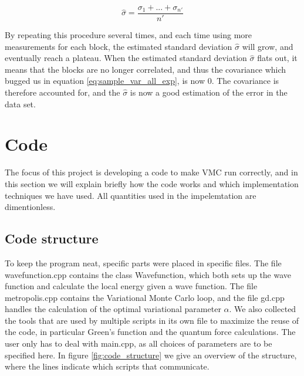 \documentclass[norsk,a4paper,12pt]{article}
\begin{document}
 \begin{equation}
 \hat{\sigma} = \frac{\sigma_1 + ... + \sigma_{n'}}{n'}
 \end{equation}
 
By repeating this procedure several times, and each time using more measurements for each block, the estimated standard deviation $\hat{\sigma}$ will grow, and eventually reach a plateau. When the estimated standard deviation $\hat{\sigma}$ flats out, it means that the blocks are no longer correlated, and thus the covariance which bugged us in equation \ref{eq:sample_var_all_exp}, is now 0. The covariance is therefore accounted for, and the $\hat{\sigma}$ is now a good estimation of the error in the data set.


\section{Code} \label{sec:code}
The focus of this project is developing a code to make VMC run correctly, and in this section we will explain briefly how the code works and which implementation techniques we have used. All quantities used in the impelemtation are dimentionless. 

\subsection{Code structure}
To keep the program neat, specific parts were placed in specific files. The file wavefunction.cpp contains the class Wavefunction, which both sets up the wave function and calculate the local energy given a wave function. The file metropolis.cpp contains the Variational Monte Carlo loop, and the file gd.cpp handles the calculation of the optimal variational parameter $\alpha$. We also collected the tools that are used by multiple scripts in its own file to maximize the reuse of the code, in particular Green's function and the quantum force calculations. The user only has to deal with main.cpp, as all choices of parameters are to be specified here.  In figure \ref{fig:code_structure} we give an overview of the structure, where the lines indicate which scripts that communicate. 
\end{document}
